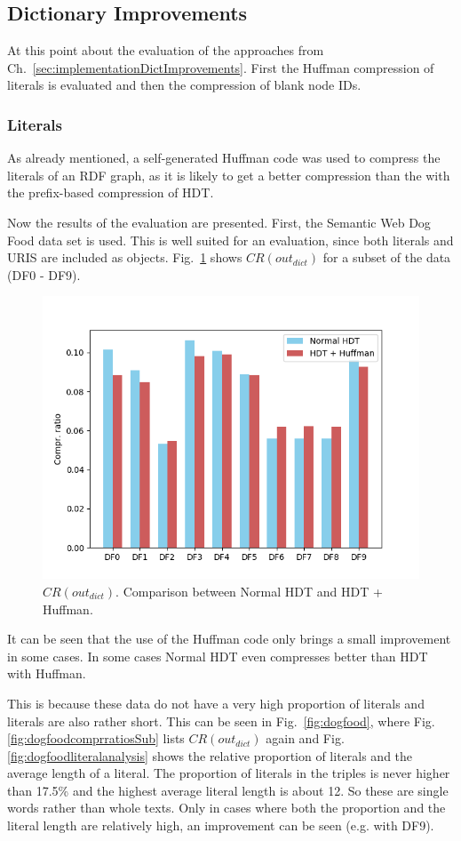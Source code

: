 \subsection{Dictionary Improvements}\label{sec:evaluationDictImprovements}

At this point  about the evaluation of the approaches from Ch.~\ref{sec:implementationDictImprovements}. First the Huffman compression of literals is evaluated and then the compression of blank node IDs. 


\subsubsection{Literals}

As already mentioned, a self-generated Huffman code was used to compress the literals of an RDF graph, as it is likely to get a better compression than the with the prefix-based compression of HDT.

Now the results of the evaluation are presented. First, the Semantic Web Dog Food data set is used. This is well suited for an evaluation, since both literals and URIS are included as objects. Fig.~\ref{fig:dogfoodcomprratios} shows $CR(out_{dict})$ for a subset of the data (DF0 - DF9). 


\begin{figure}
	\centering
	\includegraphics[width=0.7\linewidth]{figures/4_evaluation/dogFoodComprRatios}
	\caption{$CR(out_{dict})$. Comparison between Normal HDT and HDT + Huffman.}
	\label{fig:dogfoodcomprratios}
\end{figure}

It can be seen that the use of the Huffman code only brings a small improvement in some cases. In some cases Normal HDT even compresses better than HDT with Huffman.

This is because these data do not have a very high proportion of literals and literals are also rather short. This can be seen in Fig.~\ref{fig:dogfood}, where Fig.\ref{fig:dogfoodcomprratiosSub} lists $CR(out_{dict})$ again and Fig.\ref{fig:dogfoodliteralanalysis} shows the relative proportion of literals and the average length of a literal. The proportion of literals in the triples is never higher than 17.5\% and the highest average literal length is about 12. So these are single words rather than whole texts. Only in cases where both the proportion and the literal length are relatively high, an improvement can be seen (e.g. with DF9).


